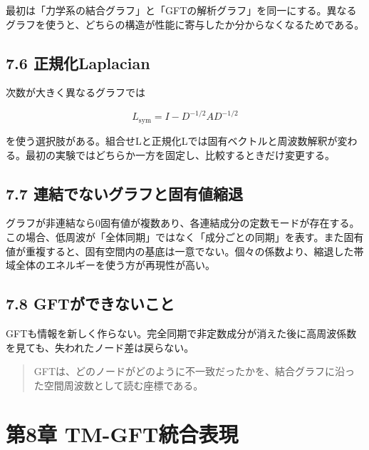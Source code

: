 \documentclass[11pt,a4paper]{ltjsarticle}
\newenvironment{keyquote}{%
  \begin{quote}\color{researchteal}\bfseries\large%
}{%
  \end{quote}%
}
\begin{document}
最初は「力学系の結合グラフ」と「GFTの解析グラフ」を同一にする。異なるグラフを使うと、どちらの構造が性能に寄与したか分からなくなるためである。\par

\subsection*{\textcolor{researchblue}{7.6 正規化Laplacian}}

次数が大きく異なるグラフでは\par

\[
L_{\mathrm{sym}}=I-D^{-1/2}AD^{-1/2}
\]

を使う選択肢がある。組合せLと正規化Lでは固有ベクトルと周波数解釈が変わる。最初の実験ではどちらか一方を固定し、比較するときだけ変更する。\par

\subsection*{\textcolor{researchblue}{7.7 連結でないグラフと固有値縮退}}

グラフが非連結なら0固有値が複数あり、各連結成分の定数モードが存在する。この場合、低周波が「全体同期」ではなく「成分ごとの同期」を表す。また固有値が重複すると、固有空間内の基底は一意でない。個々の係数より、縮退した帯域全体のエネルギーを使う方が再現性が高い。\par

\subsection*{\textcolor{researchblue}{7.8 GFTができないこと}}

GFTも情報を新しく作らない。完全同期で非定数成分が消えた後に高周波係数を見ても、失われたノード差は戻らない。\par

\begin{keyquote}

GFTは、どのノードがどのように不一致だったかを、結合グラフに沿った空間周波数として読む座標である。

\end{keyquote}

\goodbreak

\section*{\textcolor{researchink}{第8章 TM-GFT統合表現}}
\end{document}
